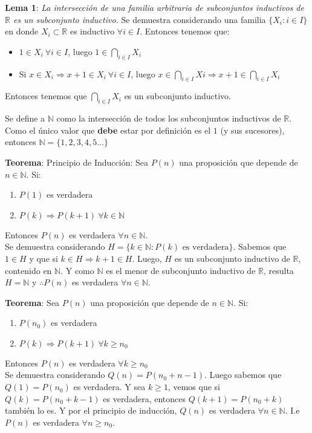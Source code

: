 \documentclass[11pt,a4paper]{article}
\begin{document}
\noindent \dotfill

\textbf{Lema 1}: \textit{La intersecci\'on de una familia arbitraria de subconjuntos inductivos de $\mathbb{R}$ es un subconjunto inductivo.} Se demuestra considerando una familia $\{ X_i : i \in I \}$ en donde $X_i \subset \mathbb{R}$ es inductivo $\forall i \in I$. Entonces tenemos que:

\begin{itemize}
\item $1 \in X_i\ \forall i \in I$, luego $1 \in \displaystyle{\bigcap_{i \in I}} X_i$
\item Si $x \in X_i \Rightarrow x+1 \in X_i\ \forall i \in I$, luego $x \in \displaystyle{\bigcap_{i \in I} Xi} \Rightarrow x + 1 \in \displaystyle{\bigcap_{i \in I}} X_i$
\end{itemize}
Entonces tenemos que $\displaystyle{\bigcap_{i \in I} X_i}$ es un subconjunto inductivo.

\noindent \dotfill

Se define a $\mathbb{N}$ como la intersecci\'on de todos los subconjuntos inductivos de $\mathbb{R}$. Como el \'unico valor que \textbf{debe} estar por definici\'on es el $1$ (y sus sucesores), entonces $\mathbb{N} = \{ 1,2,3,4,5... \}$

\noindent \dotfill

\textbf{Teorema}: Principio de Inducci\'on: Sea $P(n)$ una proposici\'on que depende de $n \in \mathbb{N}$. Si:
\begin{enumerate}
\item $P(1)$ es verdadera
\item $P(k) \Rightarrow P(k+1)\ \forall k \in \mathbb{N}$ 
\end{enumerate}
Entonces $P(n)$ es verdadera $\forall n \in \mathbb{N}$.\\

Se demuestra considerando $H = \{ k \in \mathbb{N} : P(k) \text{ es verdadera} \}$. Sabemos que $1 \in H$ y que si $k \in H \Rightarrow k+1 \in H$. Luego, $H$ es un subconjunto inductivo de $\mathbb{R}$, contenido en $\mathbb{N}$. Y como $\mathbb{N}$ es el menor de subconjunto inductivo de $\mathbb{R}$, resulta $H = \mathbb{N}$ y $\therefore P(n)$ es verdadera $\forall n \in \mathbb{N}$.

\noindent \dotfill
\newpage

\textbf{Teorema}: Sea $P(n)$ una proposici\'on que depende de $n \in \mathbb{N}$. Si:
\begin{enumerate}
\item $P(n_0)$ es verdadera
\item $P(k) \Rightarrow P(k+1)\ \forall k \geq n_0$
\end{enumerate}
Entonces $P(n)$ es verdadera $\forall k \geq n_0$\\

Se demuestra considerando $Q(n) = P(n_0 + n - 1)$. Luego sabemos que $Q(1) = P(n_0)$ es verdadera. Y sea $k \geq 1$, vemos que si $Q(k) = P(n_0 + k - 1)$ es verdadera, entonces $Q(k+1) = P(n_0 + k)$ tambi\'en lo es. Y por el principio de inducci\'on, $Q(n)$ es verdadera $\forall n \in \mathbb{N}$. I.e $P(n)$ es verdadera $\forall n \geq n_0$.
\end{document}
